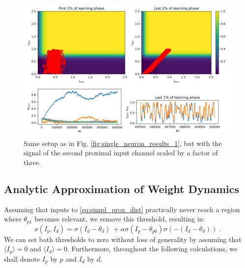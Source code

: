 \documentclass[10pt,a4paper]{article}
\begin{document}
\begin{figure}
\centering
\includegraphics[width=\textwidth]{./figures/single_neuron_results_4.png}
\caption{Same setup as in Fig. \ref{fig:single_neuron_results_1}, but with the signal of the second proximal input channel scaled by a factor of three.}
\label{fig:single_neuron_results_4}
\end{figure}

\subsection{Analytic Approximation of Weight Dynamics}

Assuming that inputs to \eqref{eq:simpl_prox_dist} practically never reach a region where $\theta_{p1}$ becomes relevant, we remove this threshold, resulting in:
\begin{equation}
x\left(I_p,I_d\right) = \sigma\left(I_d-\theta_d\right)\ + \alpha\sigma\left(I_p-\theta_{p0}\right)\sigma\left(-\left(I_d-\theta_d\right)\right) \; . \label{eq:simpl_further_prox_dist}
\end{equation}
We can set both thresholds to zero without loss of generality by assuming that $\langle I_p \rangle = 0$ and $\langle I_d \rangle = 0$. Furthermore, throughout the following calculations, we shall denote $I_p$ by $p$ and $I_d$ by $d$.
\end{document}
